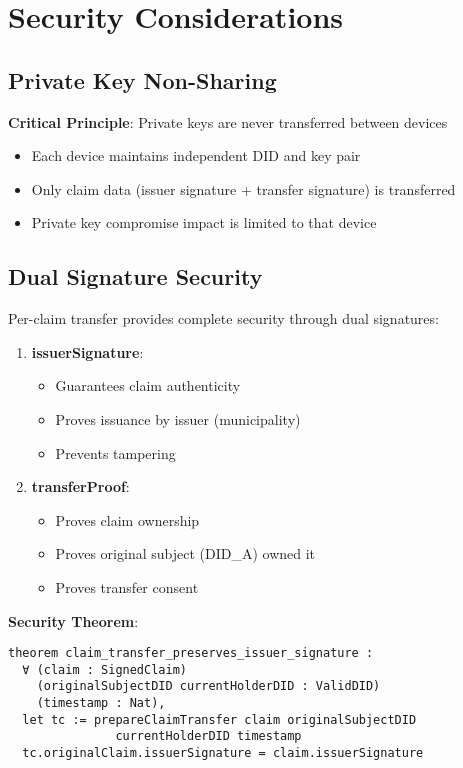 \section{Security Considerations}

\subsection{Private Key Non-Sharing}

\textbf{Critical Principle}: Private keys are never transferred between devices

\begin{itemize}
  \item Each device maintains independent DID and key pair
  \item Only claim data (issuer signature + transfer signature) is transferred
  \item Private key compromise impact is limited to that device
\end{itemize}

\subsection{Dual Signature Security}

Per-claim transfer provides complete security through dual signatures:

\begin{enumerate}
  \item \textbf{issuerSignature}:
    \begin{itemize}
      \item Guarantees claim authenticity
      \item Proves issuance by issuer (municipality)
      \item Prevents tampering
    \end{itemize}

  \item \textbf{transferProof}:
    \begin{itemize}
      \item Proves claim ownership
      \item Proves original subject (DID\_A) owned it
      \item Proves transfer consent
    \end{itemize}
\end{enumerate}

\textbf{Security Theorem}:
\begin{verbatim}
theorem claim_transfer_preserves_issuer_signature :
  ∀ (claim : SignedClaim)
    (originalSubjectDID currentHolderDID : ValidDID)
    (timestamp : Nat),
  let tc := prepareClaimTransfer claim originalSubjectDID
               currentHolderDID timestamp
  tc.originalClaim.issuerSignature = claim.issuerSignature
\end{verbatim}

